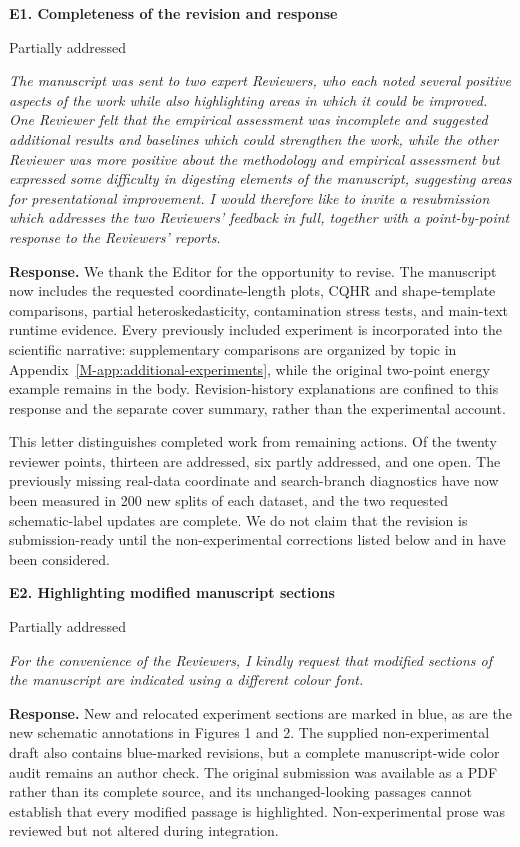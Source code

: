 \documentclass[11pt]{article}
\newcommand{\msapp}[1]{Appendix~\ref*{M-#1}}
\newcommand{\point}[3]{\par\Needspace{7\baselineskip}\medskip
\noindent\parbox[t]{0.77\linewidth}{\textbf{#1}}\hfill
\parbox[t]{0.21\linewidth}{\raggedleft\small\sffamily #2}\par\nopagebreak
{\color{ReviewerBlue}\small\itshape #3\par}\textbf{Response.} }
\begin{document}
\point{E1. Completeness of the revision and response}{Partially addressed}{The manuscript was sent to two expert Reviewers, who each noted several
positive aspects of the work while also highlighting areas in which it
could be improved. One Reviewer felt that the empirical assessment was
incomplete and suggested additional results and baselines which could
strengthen the work, while the other Reviewer was more positive about the
methodology and empirical assessment but expressed some difficulty in
digesting elements of the manuscript, suggesting areas for presentational
improvement. I would therefore like to invite a resubmission which
addresses the two Reviewers' feedback in full, together with a
point-by-point response to the Reviewers' reports.}
\label{response:E1}
We thank the Editor for the opportunity to revise. The manuscript now includes the requested coordinate-length plots, CQHR and shape-template comparisons, partial heteroskedasticity, contamination stress tests, and main-text runtime evidence. Every previously included experiment is incorporated into the scientific narrative: supplementary comparisons are organized by topic in \msapp{app:additional-experiments}, while the original two-point energy example remains in the body. Revision-history explanations are confined to this response and the separate cover summary, rather than the experimental account.

This letter distinguishes completed work from remaining actions. Of the twenty reviewer points, thirteen are addressed, six partly addressed, and one open. The previously missing real-data coordinate and search-branch diagnostics have now been measured in 200 new splits of each dataset, and the two requested schematic-label updates are complete. We do not claim that the revision is submission-ready until the non-experimental corrections listed below and in  have been considered.

\point{E2. Highlighting modified manuscript sections}{Partially addressed}{For the convenience of the Reviewers, I kindly request that modified
sections of the manuscript are indicated using a different colour font.}
\label{response:E2}
New and relocated experiment sections are marked in blue, as are the new schematic annotations in Figures 1 and 2. The supplied non-experimental draft also contains blue-marked revisions, but a complete manuscript-wide color audit remains an author check. The original submission was available as a PDF rather than its complete source, and its unchanged-looking passages cannot establish that every modified passage is highlighted. Non-experimental prose was reviewed but not altered during integration.
\end{document}
